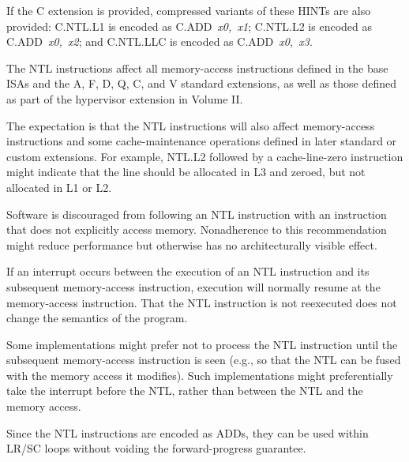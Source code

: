 If the C extension is provided, compressed variants of these HINTs are also
provided:
C.NTL.L1 is encoded as \mbox{C.ADD {\em x0, x1}};
C.NTL.L2 is encoded as \mbox{C.ADD {\em x0, x2}};
and C.NTL.LLC is encoded as \mbox{C.ADD {\em x0, x3}}.

The NTL instructions affect all memory-access instructions defined in the
base ISAs and the A, F, D, Q, C, and V standard extensions,
as well as those defined as part of the hypervisor extension in Volume II.

\begin{commentary}
The expectation is that the NTL instructions will also affect memory-access
instructions and some cache-maintenance operations
defined in later standard or custom extensions.
For example, NTL.L2 followed by a cache-line-zero instruction might indicate
that the line should be allocated in L3 and zeroed, but not allocated in
L1 or L2.
\end{commentary}

Software is discouraged from following an NTL instruction with an
instruction that does not explicitly access memory.
Nonadherence to this recommendation might reduce performance but
otherwise has no architecturally visible effect.

\begin{commentary}
If an interrupt occurs between the execution of an NTL instruction and its
subsequent memory-access instruction, execution will normally resume at the
memory-access instruction.
That the NTL instruction is not reexecuted does not change the semantics of
the program.

Some implementations might prefer not to process the NTL instruction until the
subsequent memory-access instruction is seen (e.g., so that the NTL can be
fused with the memory access it modifies).
Such implementations might preferentially take the interrupt before the NTL,
rather than between the NTL and the memory access.
\end{commentary}

\begin{commentary}
Since the NTL instructions are encoded as ADDs, they can be used within LR/SC
loops without voiding the forward-progress guarantee.
\end{commentary}
